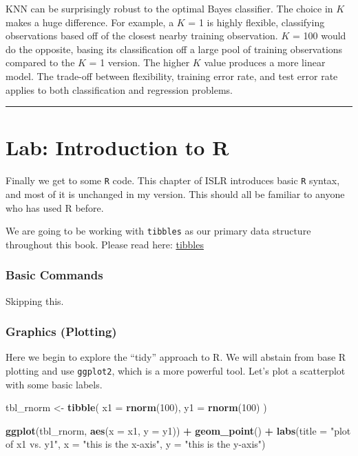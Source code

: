 \documentclass[]{book}
\newenvironment{Shaded}{\begin{snugshade}}{\end{snugshade}}
\newcommand{\KeywordTok}[1]{\textcolor[rgb]{0.13,0.29,0.53}{\textbf{#1}}}
\newcommand{\DataTypeTok}[1]{\textcolor[rgb]{0.13,0.29,0.53}{#1}}
\newcommand{\DecValTok}[1]{\textcolor[rgb]{0.00,0.00,0.81}{#1}}
\newcommand{\StringTok}[1]{\textcolor[rgb]{0.31,0.60,0.02}{#1}}
\newcommand{\OperatorTok}[1]{\textcolor[rgb]{0.81,0.36,0.00}{\textbf{#1}}}
\newcommand{\NormalTok}[1]{#1}
\theoremstyle{definition}
\theoremstyle{definition}
\theoremstyle{definition}
\theoremstyle{remark}
\begin{document}
KNN can be surprisingly robust to the optimal Bayes classifier. The
choice in \(K\) makes a huge difference. For example, a \(K\) = 1 is
highly flexible, classifying observations based off of the closest
nearby training observation. \(K\) = 100 would do the opposite, basing
its classification off a large pool of training observations compared to
the \(K\) = 1 version. The higher \(K\) value produces a more linear
model. The trade-off between flexibility, training error rate, and test
error rate applies to both classification and regression problems.

\begin{center}\rule{0.5\linewidth}{\linethickness}\end{center}

\section{Lab: Introduction to R}\label{lab-introduction-to-r}

Finally we get to some \texttt{R} code. This chapter of ISLR introduces
basic \texttt{R} syntax, and most of it is unchanged in my version. This
should all be familiar to anyone who has used R before.

We are going to be working with \texttt{tibbles} as our primary data
structure throughout this book. Please read here:
\href{http://r4ds.had.co.nz/tibbles.html}{tibbles}

\subsubsection{Basic Commands}\label{basic-commands}

Skipping this.

\subsubsection{Graphics (Plotting)}\label{graphics-plotting}

Here we begin to explore the ``tidy'' approach to R. We will abstain
from base R plotting and use \texttt{ggplot2}, which is a more powerful
tool. Let's plot a scatterplot with some basic labels.

\begin{Shaded}
\begin{Highlighting}[]
\NormalTok{tbl_rnorm <-}\StringTok{ }\KeywordTok{tibble}\NormalTok{(}
  \DataTypeTok{x1 =} \KeywordTok{rnorm}\NormalTok{(}\DecValTok{100}\NormalTok{),}
  \DataTypeTok{y1 =} \KeywordTok{rnorm}\NormalTok{(}\DecValTok{100}\NormalTok{)}
\NormalTok{)}

\KeywordTok{ggplot}\NormalTok{(tbl_rnorm, }\KeywordTok{aes}\NormalTok{(}\DataTypeTok{x =}\NormalTok{ x1, }\DataTypeTok{y =}\NormalTok{ y1)) }\OperatorTok{+}\StringTok{ }
\StringTok{  }\KeywordTok{geom_point}\NormalTok{() }\OperatorTok{+}\StringTok{ }
\StringTok{  }\KeywordTok{labs}\NormalTok{(}\DataTypeTok{title =} \StringTok{"plot of x1 vs. y1"}\NormalTok{,}
       \DataTypeTok{x =} \StringTok{"this is the x-axis"}\NormalTok{,}
       \DataTypeTok{y =} \StringTok{"this is the y-axis"}\NormalTok{)}
\end{Highlighting}
\end{Shaded}
\end{document}
